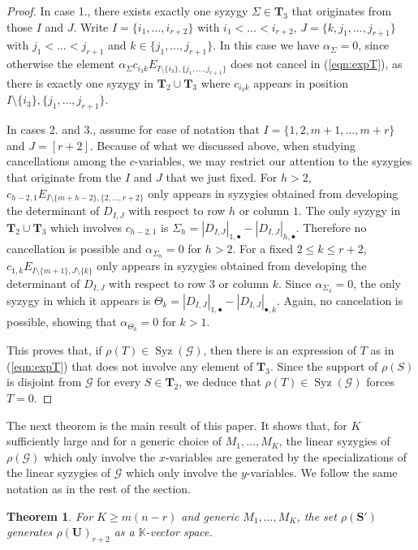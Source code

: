 \documentclass[utf8,latin1]{article}
\newtheorem{theorem}{Theorem}
\DeclareMathOperator{\Syz}{Syz}
\begin{document}
\begin{proof}
In case 1., there exists exactly one syzygy $\Sigma\in\mathbf{T}_3$ that originates from those $I$ and $J$. Write $I=\{i_1,\ldots,i_{r+2}\}$ with $i_1<\ldots<i_{r+2}$, $J=\{k,j_1,\ldots,j_{r+1}\}$ with $j_1<\ldots<j_{r+1}$ and $k\in\{j_1,\ldots,j_{r+1}\}$. In this case we have $\alpha_{\Sigma}=0$, since otherwise the element $\alpha_{\Sigma}c_{i_3 k}E_{I\setminus\{i_3\},\{j_1,\ldots,j_{r+1}\}}$ does not cancel in (\ref{eqn:expT}), as there is exactly one syzygy in $\mathbf{T}_2\cup \mathbf{T}_3$ where $c_{i_3 k}$ appears in position $I\setminus\{i_3\},\{j_1,\ldots,j_{r+1}\}$.

In cases 2. and 3., assume for ease of notation that $I=\{1,2,m+1,\ldots,m+r\}$ and $J=[r+2]$.
Because of what we discussed above, when studying cancellations among the $c$-variables, we may restrict our attention to the syzygies that originate from the $I$ and $J$ that we just fixed. For $h>2$, $c_{h-2,1}E_{I\setminus\{m+h-2\},\{2,\ldots,r+2\}}$ only appears in syzygies obtained from developing the determinant of $D_{I,J}$ with respect to row $h$ or column $1$. The only syzygy in $\mathbf{T}_2\cup \mathbf{T}_3$ which involves $c_{h-2,1}$ is $\Sigma_h=|D_{I,J}|_{1,\bullet} - |D_{I,J}|_{h,\bullet}$. Therefore no cancellation is possible and $\alpha_{\Sigma_h}=0$ for $h>2$. For a fixed $2\leq k\leq r+2$, $c_{1,k}E_{I\setminus\{m+1\},J\setminus\{k\}}$ only appears in syzygies obtained from developing the determinant of $D_{I,J}$ with respect to row $3$ or column $k$.
Since $\alpha_{\Sigma_3}=0$, the only syzygy in which it appears is $\Theta_k=|D_{I,J}|_{1,\bullet} - |D_{I,J}|_{\bullet,k}$. Again, no cancelation is possible, showing that $\alpha_{\Theta_k}=0$ for $k>1$.

This proves that, if $\rho(T)\in\Syz(\mathcal{G})$, then there is an expression of $T$ as in (\ref{eqn:expT}) that does not involve any element of $\mathbf{T}_3$. Since the support of $\rho(S)$ is disjoint from $\mathcal{G}$ for every $S\in\mathbf{T}_2$, we deduce that $\rho(T)\in\Syz(\mathcal{G})$ forces $T=0$. 
\end{proof}

The next theorem is the main result of this paper. It shows that, for $K$ sufficiently large and for a generic choice of $M_1,\ldots,M_K$, the linear syzygies of $\rho(\mathcal{G})$ which only involve the $x$-variables are generated by the specializations of the linear syzygies of $\mathcal{G}$ which only involve the $y$-variables. We follow the same notation as in the rest of the section.

\begin{theorem}\label{thm:main}
For $K\geq m(n-r)$ and generic $M_1,\ldots,M_K$, the set $\rho(\mathbf{S}')$ generates $\rho(\mathbf{U})_{r+2}$ as a $\mathbb{K}$-vector space.
\end{theorem}
\end{document}
